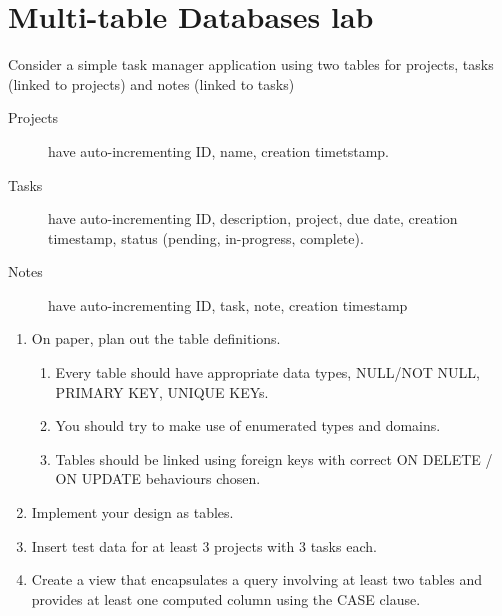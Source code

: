 \chapter{Multi-table Databases lab}
\label{ch:multi-table-databases-lab}

Consider a simple task manager application using two tables for projects, tasks (linked to projects) and notes (linked to tasks)
\begin{description}
\item[Projects] have auto-incrementing ID, name, creation timetstamp.
\item[Tasks] have auto-incrementing ID, description, project, due date, creation timestamp, status (pending, in-progress, complete).
\item[Notes] have auto-incrementing ID, task, note, creation timestamp
\end{description}

\begin{enumerate}
\item On paper, plan out the table definitions.
  \begin{enumerate}
  \item Every table should have appropriate data types, NULL/NOT NULL, PRIMARY KEY, UNIQUE KEYs.
  \item You should try to make use of enumerated types and domains.
  \item Tables should be linked using foreign keys with correct ON DELETE / ON UPDATE behaviours chosen.
  \end{enumerate}
\item Implement your design as tables.
\item Insert test data for at least 3 projects with 3 tasks each. 
\item Create a view that encapsulates a query involving at least two tables and provides at least one computed column using the CASE clause. 
\end{enumerate}



